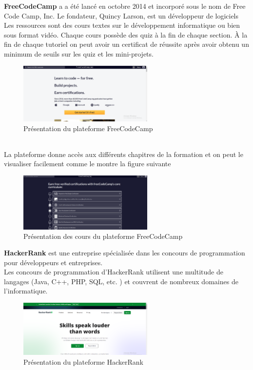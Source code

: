 \newpage
\textbf{FreeCodeCamp } a a été lancé en octobre 2014 et incorporé sous le nom de Free Code Camp, Inc. Le fondateur, Quincy Larson, est un développeur de logiciels
Les ressources sont des cours textes sur le développement informatique ou bien sous format vidéo. Chaque cours possède des quiz à la fin de chaque section. À la fin de chaque tutoriel on peut avoir un certificat de réussite après avoir obtenu un minimum de seuils sur les quiz et les mini-projets.
\begin{figure}[ht]%
    \center%
    \includegraphics[width=0.6\textwidth]{pages/images/freecodecamp.png}
    \caption[Figure 1:]{Présentation du plateforme FreeCodeCamp}\label{fig:test}%
  \end{figure}
  \\
  La plateforme donne accès aux différents chapitres de la formation et on peut le visualiser facilement comme le montre la figure suivante
  \\
\begin{figure}[ht]%
    \center%
    \includegraphics[width=0.6\textwidth]{pages/images/freecodecamp2.png}
    \caption[Figure 1:]{Présentation des cours du plateforme FreeCodeCamp}\label{fig:test}%
  \end{figure}
  \newline
\textbf{HackerRank}
 est une entreprise spécialisée dans les concours de programmation pour développeurs et entreprises.
 \\Les concours de programmation d'HackerRank utilisent une multitude de langages (Java, C++, PHP, SQL, etc. ) et couvrent de nombreux domaines de l'informatique.

\begin{figure}[ht]%
    \center%
    \includegraphics[width=0.6\textwidth]{pages/images/hackeRrank.png}
    \caption{Présentation du plateforme HackerRank}\label{fig:test}%
  \end{figure}
